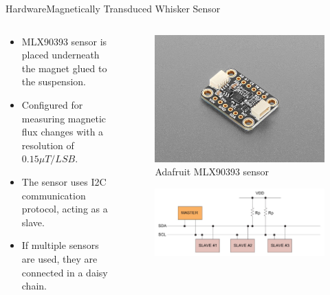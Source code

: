 \documentclass[AIRbeamer
,optEnglish
,optBiber
,optBibstyleAlphabetic
,optBeamerClassicFormat%
]{AIRlatex}
\begin{document}
    \begin{frame}{Hardware}{Magnetically Transduced Whisker Sensor}
        \begin{columns}[T,onlytextwidth]
            \begin{column}[T]{0.4\textwidth}
                \begin{itemize}
                    \item MLX90393 sensor is placed underneath the magnet glued to the suspension.
                    \item Configured for measuring magnetic flux changes with a resolution of \(0.15 \mu T/LSB\).
                    \item The sensor uses I2C communication protocol, acting as a slave.
                    \item If multiple sensors are used, they are connected in a daisy chain.
                \end{itemize}
            \end{column}
            \begin{column}[T]{0.6\textwidth}
                \begin{figure}[H]
                    \centering
                    \includegraphics[height=0.3\textheight]{figures/mlx90393}
                    \caption{Adafruit MLX90393 sensor}
                \end{figure}
                \vskip-0.5cm
                \begin{figure}[H]
                    \centering
                    \includegraphics[height=0.3\textheight]{figures/i2c}

\end{figure}
\end{column}
\end{columns}
\end{frame}
\end{document}
